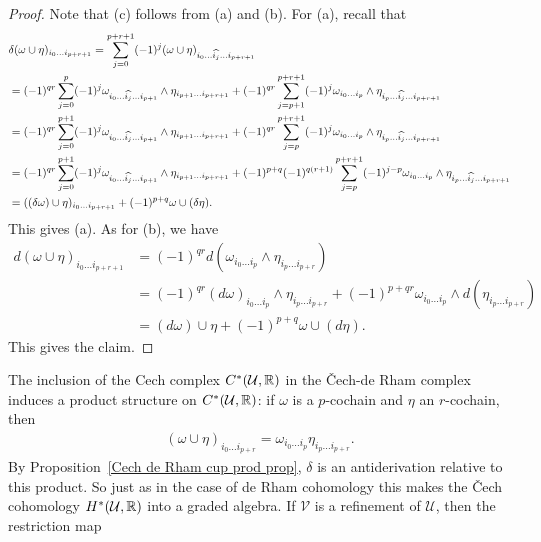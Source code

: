 \begin{proof}
Note that (c) follows from (a) and (b). For (a), recall that
\begin{equation*}
\scalemath{0.85}{
\begin{aligned}
&\delta(\omega\cup\eta)_{i_0\dots i_{p+r+1}}=\sum_{j=0}^{p+r+1}(-1)^j(\omega\cup\eta)_{i_0\dots\widehat{i_j}\dots i_{p+r+1}}\\
&=(-1)^{qr}\sum_{j=0}^{p}(-1)^j\omega_{i_0\dots\widehat{i_j}\dots i_{p+1}}\wedge\eta_{i_{p+1}\dots i_{p+r+1}}+(-1)^{qr}\sum_{j=p+1}^{p+r+1}(-1)^{j}\omega_{i_0\dots i_{p}}\wedge\eta_{i_{p}\dots\widehat{i_j}\dots i_{p+r+1}}\\
&=(-1)^{qr}\sum_{j=0}^{p+1}(-1)^j\omega_{i_0\dots\widehat{i_j}\dots i_{p+1}}\wedge\eta_{i_{p+1}\dots i_{p+r+1}}+(-1)^{qr}\sum_{j=p}^{p+r+1}(-1)^{j}\omega_{i_0\dots i_{p}}\wedge\eta_{i_{p}\dots\widehat{i_j}\dots i_{p+r+1}}\\
&=(-1)^{qr}\sum_{j=0}^{p+1}(-1)^j\omega_{i_0\dots\widehat{i_j}\dots i_{p+1}}\wedge\eta_{i_{p+1}\dots i_{p+r+1}}+(-1)^{p+q}(-1)^{q(r+1)}\sum_{j=p}^{p+r+1}(-1)^{j-p}\omega_{i_0\dots i_{p}}\wedge\eta_{i_{p}\dots\widehat{i_j}\dots i_{p+r+1}}\\
&=((\delta\omega)\cup\eta)_{i_0\dots i_{p+r+1}}+(-1)^{p+q}\omega\cup(\delta\eta).
\end{aligned}}
\end{equation*}
This gives (a). As for (b), we have
\begin{align*}
d(\omega\cup\eta)_{i_0\dots i_{p+r+1}}&=(-1)^{qr}d(\omega_{i_0\dots i_p}\wedge\eta_{i_{p}\dots i_{p+r}})\\
&=(-1)^{qr}(d\omega)_{i_0\dots i_p}\wedge\eta_{i_{p}\dots i_{p+r}}+(-1)^{p+qr}\omega_{i_0\dots i_p}\wedge d(\eta_{i_{p}\dots i_{p+r}})\\
&=(d\omega)\cup\eta+(-1)^{p+q}\omega\cup(d\eta).
\end{align*}
This gives the claim.
\end{proof}
The inclusion of the Cech complex $C^*(\mathcal{U},\mathbb{R})$ in the \v{C}ech-de Rham complex induces a product structure on $C^*(\mathcal{U},\mathbb{R})$: if $\omega$ is a $p$-cochain and $\eta$ an 
$r$-cochain, then
\begin{align}\label{Cech cup prod}
(\omega\cup\eta)_{i_0\dots i_{p+r}}=\omega_{i_0\dots i_p}\eta_{i_p\dots i_{p+r}}.
\end{align}
By Proposition~\ref{Cech de Rham cup prod prop}, $\delta$ is an antiderivation relative to this product. So just as in the case of de Rham cohomology this makes the 
\v{C}ech cohomology $H^*(\mathcal{U},\mathbb{R})$ into a graded algebra. If $\mathcal{V}$ is a refinement of $\mathcal{U}$, then the restriction map 
